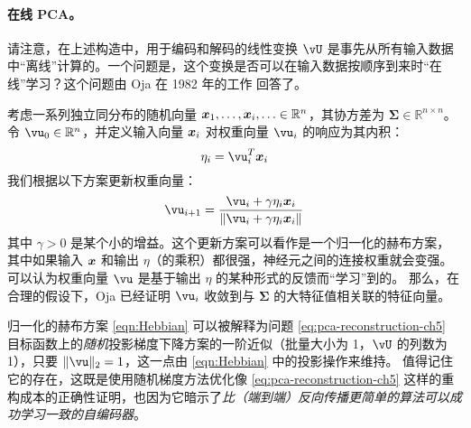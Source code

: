 \documentclass[../../book-main_zh.tex]{subfiles}
\begin{document}
\paragraph{在线 PCA。} 请注意，在上述构造中，用于编码和解码的线性变换 $\vU$ 是事先从所有输入数据中“离线”计算的。一个问题是，这个变换是否可以在输入数据按顺序到来时“在线”学习？这个问题由 Oja 在 1982 年的工作 \cite{Oja1982SimplifiedNM} 回答了。
\begin{example} 考虑一系列独立同分布的随机向量 $\bm{x}_1, \ldots, \bm{x}_i, \ldots \in
  \mathbb{R}^n$，其协方差为 $\boldsymbol{\Sigma} \in
  \mathbb{R}^{n\times n}$。令 $\vu_0 \in \mathbb{R}^n$，并定义输入向量 $\bm{x}_i$ 对权重向量 $\vu_i$ 的响应为其内积：
  \begin{equation}
    \eta_i = \vu_i^T \x_i
  \end{equation}
  我们根据以下方案更新权重向量：
  \begin{equation}
    \vu_{i+1} = \frac{\vu_i + \gamma \eta_i \x_i}{\|\vu_i + \gamma
    \eta_i \x_i\|}
    \label{eqn:Hebbian}
  \end{equation}
  其中 $\gamma >0$ 是某个小的增益。这个更新方案可以看作是一个归一化的赫布方案，其中如果输入 $\bm{x}$ 和输出 $\eta$（的乘积）都很强，神经元之间的连接权重就会变强。可以认为权重向量 $\vu$ 是基于输出 $\eta$ 的某种形式的反馈而“学习”到的。
  那么，在合理的假设下，Oja \cite{Oja1982SimplifiedNM} 已经证明 $\vu_i$ 收敛到与 $\boldsymbol{\Sigma}$ 的大特征值相关联的特征向量。
\end{example}

归一化的赫布方案 \eqref{eqn:Hebbian} 可以被解释为问题 \eqref{eq:pca-reconstruction-ch5} 目标函数上的\textit{随机}投影梯度下降方案的一阶近似（批量大小为 1，$\vU$ 的列数为 1），只要 $\norm{\vu}_2 = 1$，这一点由 \eqref{eqn:Hebbian} 中的投影操作来维持。
值得记住它的存在，这既是使用随机梯度方法优化像 \eqref{eq:pca-reconstruction-ch5} 这样的重构成本的正确性证明，也因为它暗示了\textit{比（端到端）反向传播更简单的算法可以成功学习一致的自编码器}。
\end{document}
